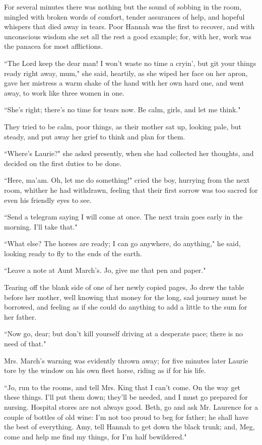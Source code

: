 For several minutes there was nothing but the sound of sobbing in the
room, mingled with broken words of comfort, tender assurances of help,
and hopeful whispers that died away in tears. Poor Hannah was the first
to recover, and with unconscious wisdom she set all the rest a good
example; for, with her, work was the panacea for most afflictions.

``The Lord keep the dear man! I won't waste no time a
cryin', but git your things ready right away, mum," she
said, heartily, as she wiped her face on her apron, gave her mistress a
warm shake of the hand with her own hard one, and went away, to work
like three women in one.

``She's right; there's no time for tears
now. Be calm, girls, and let me think."

They tried to be calm, poor things, as their mother sat up, looking
pale, but steady, and put away her grief to think and plan for them.

``Where's Laurie?" she asked presently, when she had
collected her thoughts, and decided on the first duties to be done.

``Here, ma'am. Oh, let me do something!" cried the boy,
hurrying from the next room, whither he had withdrawn, feeling that
their first sorrow was too sacred for even his friendly eyes to see.

``Send a telegram saying I will come at once. The next train goes early
in the morning. I'll take that."

``What else? The horses are ready; I can go anywhere, do anything," he
said, looking ready to fly to the ends of the earth.

``Leave a note at Aunt March's. Jo, give me that pen and
paper."

Tearing off the blank side of one of her newly copied pages, Jo drew the
table before her mother, well knowing that money for the long, sad
journey must be borrowed, and feeling as if she could do anything to add
a little to the sum for her father.

``Now go, dear; but don't kill yourself driving at a
desperate pace; there is no need of that."

Mrs. March's warning was evidently thrown away; for five
minutes later Laurie tore by the window on his own fleet horse, riding
as if for his life.

``Jo, run to the rooms, and tell Mrs. King that I can't
come. On the way get these things. I'll put them down;
they'll be needed, and I must go prepared for nursing.
Hospital stores are not always good. Beth, go and ask Mr. Laurence for a
couple of bottles of old wine: I'm not too proud to beg
for father; he shall have the best of everything. Amy, tell Hannah to
get down the black trunk; and, Meg, come and help me find my things, for
I'm half bewildered."

